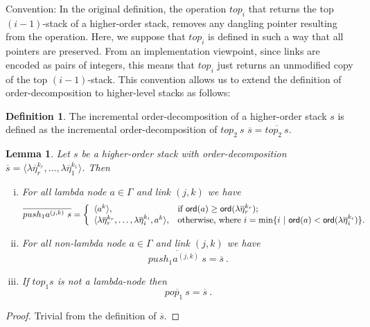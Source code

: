\documentclass{article}
\newtheorem{lemma}{Lemma}[section]
\theoremstyle{remark}
\theoremstyle{definition}
\newtheorem{definition}{Definition}[section]
\newcommand\orddec\overline
\begin{document}
Convention: In the original definition, the operation $top_i$ that returns the top $(i-1)$-stack of a higher-order stack, removes any dangling pointer resulting from the operation. Here, we suppose that $top_i$ is defined in such a way that all pointers are preserved. From an implementation viewpoint, since links are encoded as pairs of integers, this means that $top_i$ just returns an unmodified copy of the top $(i-1)$-stack. This convention allows us to
extend the definition of order-decomposition to higher-level stacks as follows:
\begin{definition}
The incremental order-decomposition
of a higher-order stack $s$ is defined as the incremental
order-decomposition of $top_2~s$ \ie $\orddec{s} = \orddec{top_2~s}$.
\end{definition}


\begin{lemma}
\label{lem:push1pop1_orderdecompo} Let $s$ be a higher-order stack
with order-decomposition $\orddec{s} = \langle \lambda
\overline{\eta}_r^{k_r}, \ldots, \lambda \overline{\eta}_1^{k_1}
\rangle$. Then
\begin{enumerate}[i.]
\item For all lambda node $a \in \Gamma$ and link $(j,k)$ we have
 $$ \orddec{push_1 a^{(j,k)}~s} = \left\{
                                       \begin{array}{ll}
                                        \langle a^k \rangle, &  \hbox{if $\ord{a} \geq \ord{\lambda \overline{\eta}_r^{k_r}}$}; \\
                                         \langle \lambda \overline{\eta}_r^{k_r}, \ldots, \lambda
\overline{\eta}_i^{k_i}, a^k \rangle, & \hbox{otherwise, where $i = \min \{ i \ | \ \ord{a} <
\ord{\lambda \overline{\eta}_i^{k_i}} \}$.}
                                       \end{array}
                                     \right.$$

\item For all non-lambda node $a \in \Gamma$ and link $(j,k)$ we have
$$ \orddec{push_1 a^{(j,k)}~s} = \orddec{s} \ .$$

\item If $top_1 s$ is not a lambda-node then
$$ \orddec{pop_1~s} = \orddec{s} \ .$$
\end{enumerate}
\end{lemma}
\begin{proof}
  Trivial from the definition of  $\orddec{s}$.
\end{proof}
\end{document}
